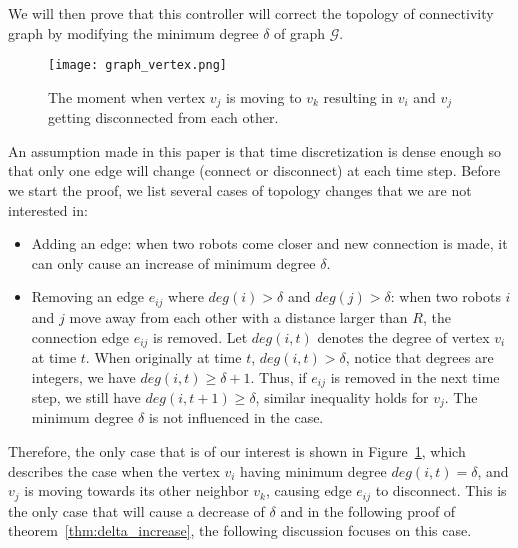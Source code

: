 \documentclass[../main.tex]{subfiles}
\begin{document}
We will then prove that this controller will correct the topology of connectivity graph by modifying the minimum degree $\delta$ of graph $\mathcal{G}$.
\begin{figure}
    \centering
    \texttt{[image: graph\_vertex.png]}
    \setlength{\belowcaptionskip}{-14pt}
    \caption{The moment when vertex $v_j$ is moving to $v_k$ resulting in $v_i$ and $v_j$ getting disconnected from each other.}
    \label{fig:graph_vertex}
\end{figure}

An assumption made in this paper is that time discretization is dense enough so that only one edge will change (connect or disconnect) at each time step. Before we start the proof, we list several cases of topology changes that we are not interested in:
\begin{itemize}
\item Adding an edge: when two robots come closer and new connection is made, it can only cause an increase of minimum degree $\delta$.
\item Removing an edge $e_{ij}$ where $deg(i) > \delta$ and $deg(j) > \delta$: when two robots $i$ and $j$ move away from each other with a distance larger than $R$, the connection edge $e_{ij}$ is removed. Let $deg(i, t)$ denotes the degree of vertex $v_i$ at time $t$. When originally at time $t$, $deg(i, t) > \delta$, notice that degrees are integers, we have $deg(i, t) \geq \delta + 1$. Thus, if $e_{ij}$ is removed in the next time step, we still have $deg(i, t+1) \geq \delta$, similar inequality holds for $v_j$. The minimum degree $\delta$ is not influenced in the case.
\end{itemize}
Therefore, the only case that is of our interest is shown in Figure~\ref{fig:graph_vertex}, which describes the case when the vertex $v_i$ having minimum degree $deg(i, t) = \delta$, and $v_j$ is moving towards its other neighbor $v_k$, causing edge $e_{ij}$ to disconnect. This is the only case that will cause a decrease of $\delta$ and in the following proof of theorem~\ref{thm:delta_increase}, the following discussion focuses on this case.
\end{document}
